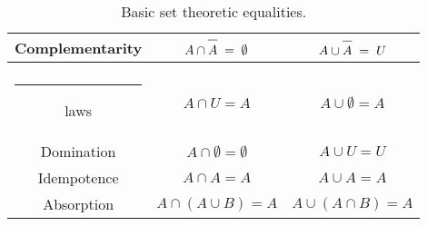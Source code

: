 \begin{table}[h]
\begin{center}
\begin{tabular}{c|c|c}
\begin{minipage}{.25\textwidth} \rule{0pt}{22pt}Complementarity\rule[-10pt]{0pt}{10pt} \end{minipage} & 
\begin{minipage}{.35\textwidth} \centerline{$A \cap \overline{\rule{0pt}{9.5pt}A} \; = \; \emptyset$} \end{minipage} & 
\begin{minipage}{.35\textwidth} \centerline{$A \cup \overline{\rule{0pt}{9.5pt}A} \; = \; U$} \end{minipage} \\ \hline 
\begin{minipage}{.25\textwidth} \rule{0pt}{22pt}Identity \\ \rule{12pt}{0pt} laws\rule[-10pt]{0pt}{10pt} \end{minipage} & 
\begin{minipage}{.35\textwidth} \centerline{$A \cap U = A$} \end{minipage} & 
\begin{minipage}{.35\textwidth} \centerline{$A \cup \emptyset = A$} \end{minipage} \\ \hline 
\begin{minipage}{.25\textwidth} \rule{0pt}{22pt}Domination\rule[-10pt]{0pt}{10pt} \end{minipage} & 
\begin{minipage}{.35\textwidth}  \centerline{$A \cap \emptyset = \emptyset$} \end{minipage} & 
\begin{minipage}{.35\textwidth} \centerline{$A \cup U = U$} \end{minipage} \\ \hline
\begin{minipage}{.25\textwidth} \rule{0pt}{22pt}Idempotence\rule[-10pt]{0pt}{10pt} \end{minipage} & 
\begin{minipage}{.35\textwidth} \centerline{$A \cap A = A$} \end{minipage} & 
\begin{minipage}{.35\textwidth} \centerline{$A \cup A = A$} \end{minipage} \\ \hline
\begin{minipage}{.25\textwidth} \rule{0pt}{22pt}Absorption\rule[-10pt]{0pt}{10pt} \end{minipage} & 
\begin{minipage}{.35\textwidth} \centerline{$A \cap (A \cup B) = A$} \end{minipage} & 
\begin{minipage}{.35\textwidth} \centerline{$A \cup (A \cap B) = A$} \end{minipage} \\
\end{tabular} 
\end{center} 
\caption{Basic set theoretic equalities.}
\label{tab:set_equiv}
\end{table}



